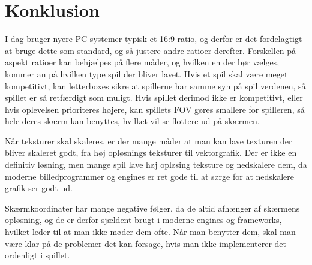 \documentclass[main.tex]{Konklusion}
\begin{document}
\chapter{Konklusion}
I dag bruger nyere PC systemer typisk et 16:9 ratio, og derfor er det fordelagtigt at bruge dette som standard, og så justere andre ratioer derefter. Forskellen på aspekt ratioer kan behjælpes på flere måder, og hvilken en der bør vælges, kommer an på hvilken type spil der bliver lavet. Hvis et spil skal være meget kompetitivt, kan letterboxes sikre at spillerne har samme syn på spil verdenen, så spillet er så retfærdigt som muligt. Hvis spillet derimod ikke er kompetitivt, eller hvis oplevelsen prioriteres højere, kan spillets FOV gøres smallere for spilleren, så hele deres skærm kan benyttes, hvilket vil se flottere ud på skærmen.

Når teksturer skal skaleres, er der mange måder at man kan lave texturen der bliver skaleret godt, fra høj opløsnings teksturer til vektorgrafik. Der er ikke en definitiv løsning, men mange spil lave høj opløsing teksture og nedskalere dem, da moderne billedprogrammer og engines er ret gode til at sørge for at nedskalere grafik ser godt ud.
  
Skærmkoordinater har mange negative følger, da de altid afhænger af skærmens opløsning, og de er derfor sjældent brugt i moderne engines og frameworks, hvilket leder til at man ikke møder dem ofte. Når man benytter dem, skal man være klar på de problemer det kan forsage, hvis man ikke implementerer det ordenligt i spillet.
\end{document}
